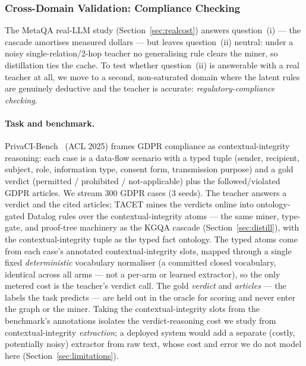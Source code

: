 \documentclass[11pt]{article}
\theoremstyle{plain}
\begin{document}
\subsubsection{Cross-Domain Validation: Compliance Checking}
\label{sec:compliance}
The MetaQA real-LLM study (Section~\ref{sec:realcost}) answers question~(i) ---
the cascade amortises measured dollars --- but leaves question~(ii) neutral:
under a noisy single-relation/2-hop teacher no generalising rule clears the
miner, so distillation ties the cache. To test whether question~(ii) is
answerable with a real teacher at all, we move to a second, non-saturated
domain where the latent rules are genuinely deductive and the teacher is
accurate: \emph{regulatory-compliance checking}.

\paragraph{Task and benchmark.} PrivaCI-Bench~\citep{privacibench2025} (ACL
2025) frames GDPR compliance as contextual-integrity reasoning: each case is a
data-flow scenario with a typed tuple (sender, recipient, subject, role,
information type, consent form, transmission purpose) and a gold verdict
(permitted / prohibited / not-applicable) plus the followed/violated GDPR
articles. We stream $300$ GDPR cases ($3$ seeds). The teacher answers a
verdict and the cited articles; TACET mines the verdicts online into
ontology-gated Datalog rules over the contextual-integrity atoms --- the same
miner, type-gate, and proof-tree machinery as the KGQA cascade
(Section~\ref{sec:distill}), with the contextual-integrity tuple as the typed
fact ontology. The typed atoms come from each case's annotated
contextual-integrity slots, mapped through a single fixed \emph{deterministic}
vocabulary normaliser (a committed closed vocabulary, identical across all arms
--- not a per-arm or learned extractor), so the only metered cost is the
teacher's verdict call. The gold \emph{verdict} and \emph{articles} --- the
labels the task predicts --- are held out in the oracle for scoring and never
enter the graph or the miner. Taking the contextual-integrity slots from the
benchmark's annotations isolates the verdict-reasoning cost we study from
contextual-integrity \emph{extraction}; a deployed system would add a separate
(costly, potentially noisy) extractor from raw text, whose cost and error we do
not model here (Section~\ref{sec:limitations}).
\end{document}
